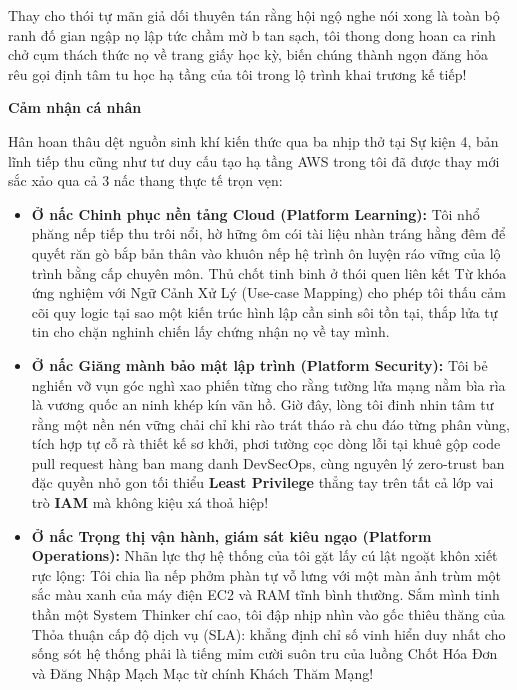 Thay cho thói tự mãn giả dối thuyên tán rằng hội ngộ nghe nói xong là
toàn bộ ranh đố gian ngập nọ lập tức chầm mờ b tan sạch, tôi thong dong
hoan ca rinh chở cụm thách thức nọ về trang giấy học kỳ, biến chúng
thành ngọn đăng hỏa rêu gọi định tâm tu học hạ tầng của tôi trong lộ
trình khai trương kế tiếp!

\vspace{0.5em}\noindent\textbf{Cảm nhận cá nhân}\par

Hân hoan thâu dệt nguồn sinh khí kiến thức qua ba nhịp thở tại Sự kiện
4, bản lĩnh tiếp thu cũng như tư duy cấu tạo hạ tầng AWS trong tôi đã
được thay mới sắc xảo qua cả 3 nấc thang thực tế trọn vẹn:

\begin{itemize}
\tightlist
\item
  \textbf{Ở nấc Chinh phục nền tảng Cloud (Platform Learning):} Tôi nhổ
  phăng nếp tiếp thu trôi nổi, hờ hững ôm cói tài liệu nhàn tráng hằng
  đêm để quyết răn gò bắp bản thân vào khuôn nếp hệ trình ôn luyện ráo
  vững của lộ trình bằng cấp chuyên môn. Thủ chốt tinh binh ở thói quen
  liên kết Từ khóa ứng nghiệm với Ngữ Cảnh Xử Lý (Use-case Mapping) cho
  phép tôi thấu cảm cõi quy logic tại sao một kiến trúc hình lập cần
  sinh sôi tồn tại, thắp lửa tự tin cho chặn nghinh chiến lấy chứng nhận
  nọ về tay mình.
\item
  \textbf{Ở nấc Giăng mành bảo mật lập trình (Platform Security):} Tôi
  bẻ nghiến vỡ vụn góc nghì xao phiến từng cho rằng tường lửa mạng nằm
  bìa rìa là vương quốc an ninh khép kín vãn hồ. Giờ đây, lòng tôi đinh
  nhin tâm tư rằng một nền nén vững chải chỉ khi rào trát tháo rà chu
  đáo từng phân vùng, tích hợp tự cỗ rà thiết kế sơ khởi, phơi tường cọc
  dòng lỗi tại khuê gộp code pull request hàng ban mang danh DevSecOps,
  cùng nguyên lý zero-trust ban đặc quyền nhỏ gon tối thiểu
  \textbf{Least Privilege} thẳng tay trên tất cả lớp vai trò
  \textbf{IAM} mà không kiệu xá thoả hiệp!
\item
  \textbf{Ở nấc Trọng thị vận hành, giám sát kiêu ngạo (Platform
  Operations):} Nhãn lực thợ hệ thống của tôi gặt lấy cú lật ngoặt khôn
  xiết rực lộng: Tôi chia lìa nếp phởm phàn tự vỗ lưng với một màn ảnh
  trùm một sắc màu xanh của máy điện EC2 và RAM tĩnh bình thường. Sắm
  mình tinh thần một System Thinker chí cao, tôi đập nhịp nhìn vào gốc
  thiêu thăng của Thỏa thuận cấp độ dịch vụ (SLA): khẳng định chỉ số
  vinh hiển duy nhất cho sống sót hệ thống phải là tiếng mỉm cười suôn
  tru của luồng Chốt Hóa Đơn và Đăng Nhập Mạch Mạc từ chính Khách Thăm
  Mạng!
\end{itemize}

